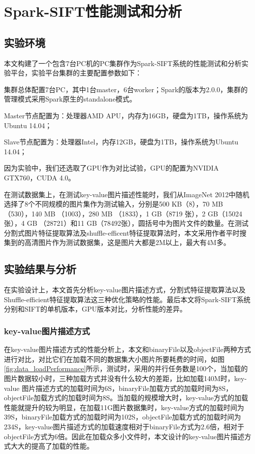 ﻿\chapter{Spark-SIFT性能测试和分析}
\section{实验环境}
本文构建了一个包含7台PC机的PC集群作为Spark-SIFT系统的性能测试和分析实验平台，实验平台集群的主要配置参数如下：
\begin{compactenum}
\item 集群总体配置7台PC，其中1台master，6台worker；Spark的版本为2.0.0，集群的管理模式采用Spark原生的standalone模式。
\item Master节点配置为：处理器AMD APU，内存为16GB，硬盘为1TB，操作系统为Ubuntu 14.04；
\item Slave节点配置为：处理器Intel，内存12GB，硬盘为1TB，操作系统为Ubuntu 14.04；
\end{compactenum}

因为实验中，我们还选取了GPU作为对比试验，GPU的配置为NVIDIA GTX760，CUDA 4.0。

在测试数据集上，在测试key-value图片描述性能时，我们从ImageNet 2012中随机选择了8个不同规模的图片集作为测试输入，分别是500 KB（8），70 MB （530），140 MB （1003），280 MB （1833），1 GB（8719 张），2 GB（15024张），4 GB （28721）和11 GB（78492张），圆括号中为图片文件的数量。在测试分割式图片特征提取算法及shuffle-efficent特征提取算法时，本文采用作者平时搜集到的高清图片作为测试数据集，这是图片大都是2M以上，最大有4M多。
\section{实验结果与分析}
在实验设计上，本文首先分析key-value图片描述方式，分割式特征提取算法以及Shuffle-efficient特征提取算法这三种优化策略的性能。最后本文将Spark-SIFT系统分别和SIFT的单机版本，GPU版本对比，分析性能的差异。
\subsection{key-value图片描述方式}
在key-value图片描述方式的性能分析上，本文和binaryFile以及objectFile两种方式进行对比，对比它们在加载不同的数据集大小图片所要耗费的时间，如图\ref{fig:data_loadPerformance}所示，测试时，采用的并行任务数是100个，当加载的图片数据较小时，三种加载方式并没有什么较大的差距，比如加载140M时，key-value 图片描述方式的加载时间为6S，binaryFile加载方式的加载时间为8S，objectFile加载方式的加载时间为8S。当加载的规模增大时，key-value方式的加载性能就提升的较为明显，在加载11G图片数据集时，key-value方式的加载时间为39S，binaryFile加载方式的加载时间为102S，objectFile加载方式的加载时间为234S，key-value图片描述方式的加载速度相对于binaryFile方式为2.6倍，相对于objectFile方式为6倍。因此在加载众多小文件时，本文设计的key-value图片描述方式大大的提高了加载的性能。

